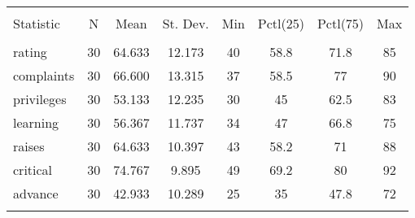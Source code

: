 \documentclass[a4paper, 12pt]{article}
\begin{document}
\begin{table}[!htbp] \centering 
  \caption{} 
  \label{} 
\begin{tabular}{@{\extracolsep{5pt}}lccccccc} 
\\[-1.8ex]\hline 
\hline \\[-1.8ex] 
Statistic & \multicolumn{1}{c}{N} & \multicolumn{1}{c}{Mean} & \multicolumn{1}{c}{St. Dev.} & \multicolumn{1}{c}{Min} & \multicolumn{1}{c}{Pctl(25)} & \multicolumn{1}{c}{Pctl(75)} & \multicolumn{1}{c}{Max} \\ 
\hline \\[-1.8ex] 
rating & 30 & 64.633 & 12.173 & 40 & 58.8 & 71.8 & 85 \\ 
complaints & 30 & 66.600 & 13.315 & 37 & 58.5 & 77 & 90 \\ 
privileges & 30 & 53.133 & 12.235 & 30 & 45 & 62.5 & 83 \\ 
learning & 30 & 56.367 & 11.737 & 34 & 47 & 66.8 & 75 \\ 
raises & 30 & 64.633 & 10.397 & 43 & 58.2 & 71 & 88 \\ 
critical & 30 & 74.767 & 9.895 & 49 & 69.2 & 80 & 92 \\ 
advance & 30 & 42.933 & 10.289 & 25 & 35 & 47.8 & 72 \\ 
\hline \\[-1.8ex] 
\end{tabular} 
\end{table}
\end{document}
